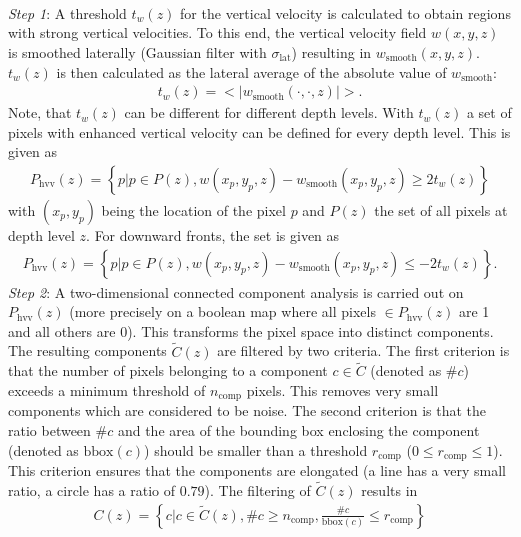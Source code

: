 \\
\\
\\
\textit{Step 1}: A threshold $t_w(z)$ for the vertical velocity is calculated to obtain regions with strong vertical velocities. To this end, the vertical velocity field $w(x, y, z)$ is smoothed laterally (Gaussian filter with $\sigma_\text{lat}$) resulting in $w_\text{smooth}(x, y, z)$. $t_w(z)$ is then calculated as the lateral average of the absolute value of $w_\text{smooth}$:
\begin{align}
    t_w(z) = <|w_\text{smooth}(\cdot, \cdot, z)|>.
\end{align}
Note, that $t_w(z)$ can be different for different depth levels. With $t_w(z)$ a set of pixels with enhanced vertical velocity can be defined for every depth level. This is given as
\begin{align}
    P_\text{hvv}(z) = \left\{p | p \in P(z), w(x_p, y_p, z) - w_\text{smooth}(x_p, y_p, z) \ge 2 t_w(z)\right\}
\end{align}
with $(x_p, y_p)$ being the location of the pixel $p$ and $P(z)$ the set of all pixels at depth level $z$. For downward fronts, the set is given as
\begin{align}
    P_\text{hvv}(z) = \left\{p | p \in P(z), w(x_p, y_p, z) - w_\text{smooth}(x_p, y_p, z) \le -2 t_w(z)\right\}.
\end{align}
\textit{Step 2}: A two-dimensional connected component analysis is carried out on $P_\text{hvv}(z)$ (more precisely on a boolean map where all pixels $\in P_\text{hvv}(z)$ are 1 and all others are 0). This transforms the pixel space into distinct components. The resulting components $\widetilde{C}(z)$ are filtered by two criteria. The first criterion is that the number of pixels belonging to a component $c \in \widetilde{C}$ (denoted as $\#c$) exceeds a minimum threshold of $n_\text{comp}$ pixels. This removes very small components which are considered to be noise. The second criterion is that the ratio between $\#c$ and the area of the bounding box enclosing the component (denoted as $\text{bbox}(c)$) should be smaller than a threshold $r_\text{comp}$ ($0 \le r_\text{comp} \le 1$). This criterion ensures that the components are elongated (a line has a very small ratio, a circle has a ratio of $0.79$). The filtering of $\widetilde{C}(z)$ results in
\begin{align}
    C(z) = \left\{c | c \in \widetilde{C}(z), \#c \ge n_\text{comp}, \frac{\#c}{\text{bbox}(c)} \le r_\text{comp}\right\}
\end{align}
